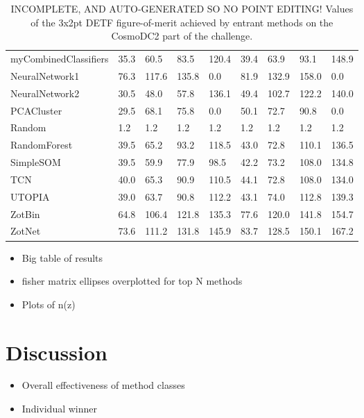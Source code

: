 \documentclass[twocolumn,twocolappendix]{aastex63}
\begin{document}
\begin{table*}[]
\begin{tabular}{|l|llll|llll|}
{\sc myCombinedClassifiers } & 35.3 & 60.5    & 83.5    & 120.4    & 39.4             & 63.9             & 93.1             & 148.9\\
{\sc NeuralNetwork1 } & 76.3 & 117.6    & 135.8    & 0.0    & 81.9             & 132.9             & 158.0             & 0.0\\
{\sc NeuralNetwork2 } & 30.5 & 48.0    & 57.8    & 136.1    & 49.4             & 102.7             & 122.2             & 140.0\\
{\sc PCACluster } & 29.5 & 68.1    & 75.8    & 0.0    & 50.1             & 72.7             & 90.8             & 0.0\\
{\sc Random } & 1.2 & 1.2    & 1.2    & 1.2    & 1.2             & 1.2             & 1.2             & 1.2\\
{\sc RandomForest } & 39.5 & 65.2    & 93.2    & 118.5    & 43.0             & 72.8             & 110.1             & 136.5\\
{\sc SimpleSOM } & 39.5 & 59.9    & 77.9    & 98.5    & 42.2             & 73.2             & 108.0             & 134.8\\
{\sc TCN } & 40.0 & 65.3    & 90.9    & 110.5    & 44.1             & 72.8             & 108.0             & 134.0\\
{\sc UTOPIA } & 39.0 & 63.7    & 90.8    & 112.2    & 43.1             & 74.0             & 112.8             & 139.3\\
{\sc ZotBin } & 64.8 & 106.4    & 121.8    & 135.3    & 77.6             & 120.0             & 141.8             & 154.7\\
{\sc ZotNet } & 73.6 & 111.2    & 131.8    & 145.9    & 83.7             & 128.5             & 150.1             & 167.2\\
\end{tabular}
\caption{INCOMPLETE, AND AUTO-GENERATED SO NO POINT EDITING! Values of the 3x2pt DETF figure-of-merit achieved by entrant methods on the 
CosmoDC2 part of the challenge.}
\end{table*}

\begin{itemize}
    \item Big table of results
    \item fisher matrix ellipses overplotted for top N methods
    \item Plots of n(z)
\end{itemize}

\section{Discussion}
\begin{itemize}
    \item Overall effectiveness of method classes
    \item Individual winner
\end{itemize}
\end{document}
